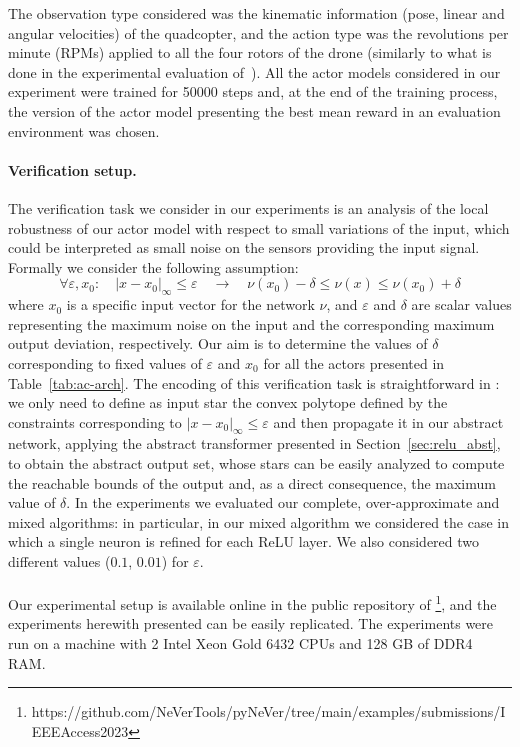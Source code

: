 The observation type considered was the kinematic information (pose, linear and angular 
velocities) of the quadcopter, and the action type was the revolutions per minute 
(RPMs) applied to all the four rotors of the drone (similarly to what is done in
the experimental evaluation of~\cite{DBLP:conf/iros/PaneratiZZXPS21}).
All the actor models considered in our experiment were trained 
for 50000 steps and, at the end of the training process, the version
of the actor model 
presenting the best mean reward in an evaluation environment was chosen.
%
%
\paragraph{Verification setup.} The verification task we consider in our 
experiments is an analysis of the local robustness of our actor model with respect to 
small variations of the input, which could be interpreted as small noise on the 
sensors providing the input signal. Formally we consider the following assumption:
%
\begin{equation}
	\forall \varepsilon, x_0: \quad |x - x_0|_\infty \leq \varepsilon \quad \rightarrow \quad \nu(x_0) - \delta \leq \nu(x) \leq \nu(x_0) + \delta
	\label{eq:local-robustness}
\end{equation}
%
where $x_0$ is a specific input vector for the network $\nu$, and $\varepsilon$ and 
$\delta$ are scalar values representing the maximum noise on the input and the 
corresponding maximum output deviation, respectively. Our aim is to determine the 
values of $\delta$ corresponding to fixed values of $\varepsilon$ and $x_0$ for all 
the actors presented in Table~\ref{tab:ac-arch}.
The encoding of this verification task is straightforward in \nevertwo{}: we only need 
to define as input star the convex polytope defined by the constraints corresponding 
to $|x - x_0|_\infty \leq \varepsilon$ and then propagate it in our abstract network, 
applying the abstract transformer presented in Section~\ref{sec:relu_abst}, to 
obtain the abstract output set, whose stars can be easily analyzed to compute the 
reachable bounds of the output and, as a direct consequence, the maximum value of 
$\delta$. In the experiments we evaluated our complete, over-approximate and mixed 
algorithms: in particular, in our mixed algorithm we considered the case in which 
a single neuron is refined for each ReLU layer. We also considered two different 
values ($0.1$, $0.01$) for $\varepsilon$.
\\\\
Our experimental setup is available online in the public repository of
\pynever\footnote{https://github.com/NeVerTools/pyNeVer/tree/main/examples/submissions/IEEEAccess2023}, 
and the experiments herewith presented can be easily replicated.
The experiments were run on a machine with 2 Intel Xeon Gold 6432 CPUs and 128 GB of DDR4 RAM.
%